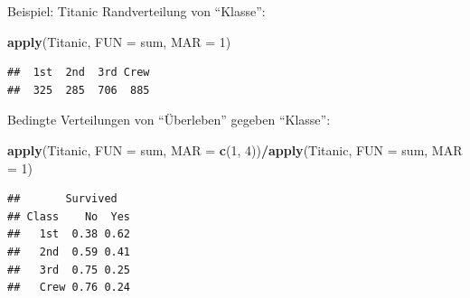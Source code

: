 \documentclass[
  10pt,
  ignorenonframetext,
]{beamer}
\newenvironment{Shaded}{\begin{snugshade}}{\end{snugshade}}
\newcommand{\AttributeTok}[1]{\textcolor[rgb]{0.13,0.29,0.53}{#1}}
\newcommand{\DecValTok}[1]{\textcolor[rgb]{0.00,0.00,0.81}{#1}}
\newcommand{\FunctionTok}[1]{\textcolor[rgb]{0.13,0.29,0.53}{\textbf{#1}}}
\newcommand{\NormalTok}[1]{#1}
\newcommand{\SpecialCharTok}[1]{\textcolor[rgb]{0.81,0.36,0.00}{\textbf{#1}}}
\begin{document}
\begin{frame}[fragile]{Beispiel: Titanic}
\protect\hypertarget{beispiel-titanic-1}{}
Randverteilung von ``Klasse'': \scriptsize

\begin{Shaded}
\begin{Highlighting}[]
\FunctionTok{apply}\NormalTok{(Titanic, }\AttributeTok{FUN =}\NormalTok{ sum, }\AttributeTok{MAR =} \DecValTok{1}\NormalTok{)}
\end{Highlighting}
\end{Shaded}

\begin{verbatim}
##  1st  2nd  3rd Crew 
##  325  285  706  885
\end{verbatim}

\normalsize

Bedingte Verteilungen von ``Überleben'' gegeben ``Klasse'': \scriptsize

\begin{Shaded}
\begin{Highlighting}[]
\FunctionTok{apply}\NormalTok{(Titanic, }\AttributeTok{FUN =}\NormalTok{ sum, }\AttributeTok{MAR =} \FunctionTok{c}\NormalTok{(}\DecValTok{1}\NormalTok{, }\DecValTok{4}\NormalTok{))}\SpecialCharTok{/}\FunctionTok{apply}\NormalTok{(Titanic, }\AttributeTok{FUN =}\NormalTok{ sum, }\AttributeTok{MAR =} \DecValTok{1}\NormalTok{)}
\end{Highlighting}
\end{Shaded}

\begin{verbatim}
##       Survived
## Class    No  Yes
##   1st  0.38 0.62
##   2nd  0.59 0.41
##   3rd  0.75 0.25
##   Crew 0.76 0.24
\end{verbatim}

\normalsize
\end{frame}
\end{document}
